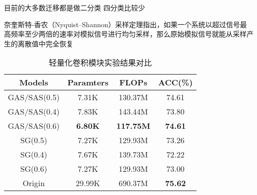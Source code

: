 目前的大多数迁移都是做二分类 四分类比较少

奈奎斯特-香农（Nyquist–Shannon）采样定理指出，如果一个系统以超过信号最高频率至少两倍的速率对模拟信号进行均匀采样，那么原始模拟信号就能从采样产生的离散值中完全恢复


\begin{table}[ht]
  \centering
  \caption{轻量化卷积模块实验结果对比}
  \label{tab:lite}
  \begin{tabularx}{\textwidth}{CCCC}
    \toprule
    Models & Paramters & FLOPs & ACC(\%) \\
    \midrule
    GAS/SAS(0.5) & 7.31K & 130.37M & 74.61\\
    GAS/SAS(0.4) & 7.83K & 143.44M & 73.80\\
    GAS/SAS(0.6) & \textbf{6.80K} & \textbf{117.75M} & \textbf{74.61}\\
    SG(0.5) & 7.27K & 129.93M & 73.26\\
    SG(0.4) & 7.67K & 139.73M & 72.22\\
    SG(0.6) & 7.27K & 129.93M & 73.00\\
    Origin & 29.99K & 690.37M & \textbf{75.62}\\
    \bottomrule
  \end{tabularx}
\end{table}